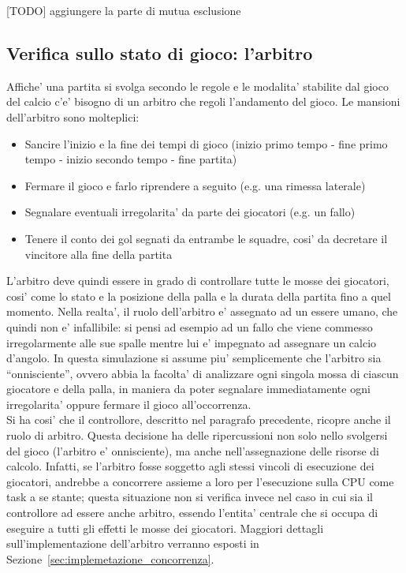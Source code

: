[TODO] aggiungere la parte di mutua esclusione

\subsection*{Verifica sullo stato di gioco: l'arbitro}
%
\label{sec:modello_verifica_arbitro}

Affiche' una partita si svolga secondo le regole e le modalita' stabilite dal gioco del calcio c'e' bisogno di un arbitro che regoli l'andamento del gioco. Le mansioni dell'arbitro sono molteplici:

\begin{itemize}
	\item Sancire l'inizio e la fine dei tempi di gioco (inizio primo tempo - fine primo tempo - inizio secondo tempo - fine partita)
	\item Fermare il gioco e farlo riprendere a seguito (e.g. una rimessa laterale)
	\item Segnalare eventuali irregolarita' da parte dei giocatori (e.g. un fallo)
	\item Tenere il conto dei gol segnati da entrambe le squadre, cosi' da decretare il vincitore alla fine della partita
\end{itemize}

L'arbitro deve quindi essere in grado di controllare tutte le mosse dei giocatori, cosi' come lo stato e la posizione della palla e la durata della partita fino a quel momento. Nella realta', il ruolo dell'arbitro e' assegnato ad un essere umano, che quindi non e' infallibile: si pensi ad esempio ad un fallo che viene commesso irregolarmente alle sue spalle mentre lui e' impegnato ad assegnare un calcio d'angolo. In questa simulazione si assume piu' semplicemente che l'arbitro sia ``onnisciente'', ovvero abbia la facolta' di analizzare ogni singola mossa di ciascun giocatore e della palla, in maniera da poter segnalare immediatamente ogni irregolarita' oppure fermare il gioco all'occorrenza.\\

Si ha cosi' che il controllore, descritto nel paragrafo precedente, ricopre anche il ruolo di arbitro. Questa decisione ha delle ripercussioni non solo nello svolgersi del gioco (l'arbitro e' onnisciente), ma anche nell'assegnazione delle risorse di calcolo. Infatti, se l'arbitro fosse soggetto agli stessi vincoli di esecuzione dei giocatori, andrebbe a concorrere assieme a loro per l'esecuzione sulla CPU come task a se stante; questa situazione non si verifica invece nel caso in cui sia il controllore ad essere anche arbitro, essendo l'entita' centrale che si occupa di eseguire a tutti gli effetti le mosse dei giocatori. Maggiori dettagli sull'implementazione dell'arbitro verranno esposti in Sezione~\ref{sec:implemetazione_concorrenza}.


